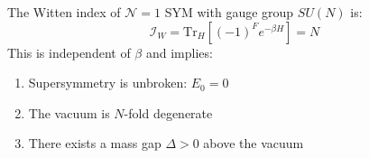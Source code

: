 \begin{theorem}[Witten Index for $\mathcal{N}=1$ SYM]
\label{thm:witten-index-roadmap}
The Witten index of $\mathcal{N}=1$ SYM with gauge group $SU(N)$ is:
\begin{equation}
\mathcal{I}_W = \mathrm{Tr}_{H}[(-1)^F e^{-\beta H}] = N
\end{equation}
This is independent of $\beta$ and implies:
\begin{enumerate}
\item Supersymmetry is unbroken: $E_0 = 0$
\item The vacuum is $N$-fold degenerate
\item There exists a mass gap $\Delta > 0$ above the vacuum
\end{enumerate}
\end{theorem}

